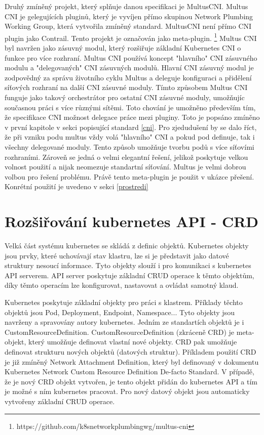 Druhý zmíněný projekt, který splňuje danou specifikaci je MultusCNI. Multus CNI je gelegujících pluginů, který je vyvíjen přímo skupinou Network Plumbing Working Group, která vytvořila zmíněný standard. MultusCNI není přímo CNI plugin jako Contrail. Tento projekt je označován jako meta-plugin. \footnote{https://github.com/k8snetworkplumbingwg/multus-cni} Multus CNI byl navržen jako zásuvný modul, který rozšiřuje základní Kubernetes CNI o funkce pro více rozhraní. Multus CNI používá koncept "hlavního" CNI zásuvného modulu a "delegovaných" CNI zásuvných modulů. Hlavní CNI zásuvný modul je zodpovědný za správu životního cyklu Multus a deleguje konfiguraci a přidělení síťových rozhraní na další CNI zásuvné moduly. Tímto způsobem Multus CNI funguje jako takový orchestrátor pro ostatní CNI zásuvné moduly, umožňujíc současnou práci s více různými sítěmi. Toto chování je umožněno především tím, že specifikace CNI možnost delegace práce mezi pluginy. Toto je popsáno zmíněno v první kapitole v sekci popisující standard \ref{cni}. Pro zjedudušení by se dalo říct, že při vzniku podu multus vždy volá "hlavního" CNI a pokud pod definuje, tak i všechny delegované moduly. Tento způsob umožňuje tvorbu podů s více síťovími rozhraními. Zároveň se jedná o velmi elegantní řešení, jelikož poskytuje velkou volnost použití a nijak neomezuje standartní síťování. Multus je velmi dobrou volbou pro řešení problému. Právě tento meta-plugin je použit v ukázce přešení. Konrétní použití je uvedeno v sekci \ref{prostredi}

\section{Rozšiřování kubernetes API - CRD}
Velká část systému kubernetes se skládá z definic objektů. Kubernetes objekty jsou prvky, které uchovávají stav klastru, lze si je představit jako datové struktury nesoucí informace. Tyto objekty slouží i pro komunikaci s kubernetes API serverem. API server poskytuje základní CRUD operace k těmto objektům, díky těmto operacím lze konfigurovat, nastavovat a ovládat samotný klaud.

Kubernetes poskytuje základní objekty pro práci s klastrem. Příklady těchto objektů jsou Pod, Deployment, Endpoint, Namespace... Tyto objekty jsou navrženy a spravovány autory kubernetes. Jedním ze standartích objektů je i CustomResourceDefinition. CustomResourceDefinition (zkráceně CRD) je meta-objekt, který umožňuje definovat vlastní nové objekty. CRD pak umožňuje definovat strukturu nových objektů (datových struktur). Příkladem použití CRD je již zmíněný Network Attachment Definition, který byl definovaný v dokumentu Kubernetes Network Custom Resource Definition De-facto Standard. V případě, že je nový CRD objekt vytvořen, je tento objekt přidán do kubernetes API a tím je možné s ním kubernetes pracovat. Pro nový datový objekt jsou automaticky vytvořeny základní CRUD operace.

